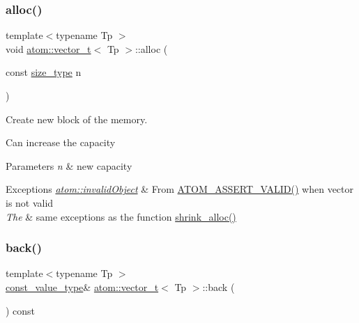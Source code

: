 \subsubsection{\texorpdfstring{alloc()}{alloc()}}
{\footnotesize\ttfamily template$<$typename Tp $>$ \\
void \hyperlink{classatom_1_1vector__t}{atom\+::vector\+\_\+t}$<$ Tp $>$\+::alloc (\begin{DoxyParamCaption}\item[{const \hyperlink{classatom_1_1vector__t_a1790d79321f4fa8d2580474dd0f56033}{size\+\_\+type}}]{n }\end{DoxyParamCaption})\hspace{0.3cm}{\ttfamily [private]}}



Create new block of the memory. 

Can increase the capacity 
\begin{DoxyParams}{Parameters}
{\em n} & new capacity \\
\hline
\end{DoxyParams}

\begin{DoxyExceptions}{Exceptions}
{\em \hyperlink{classatom_1_1invalid_object}{atom\+::invalid\+Object}} & From \hyperlink{debug__tools_8h_a273b49426c51bc6a7eb989ee0acbdc6b}{A\+T\+O\+M\+\_\+\+A\+S\+S\+E\+R\+T\+\_\+\+V\+A\+L\+I\+D()} when vector is not valid \\
\hline
{\em The} & same exceptions as the function \hyperlink{classatom_1_1vector__t_afdf1ffed030302fa380605478984b854}{shrink\+\_\+alloc()} \\
\hline
\end{DoxyExceptions}
\mbox{\label{classatom_1_1vector__t_a081ce30b6b112520ce41879cf383a409}} 
\subsubsection{\texorpdfstring{back()}{back()}}
{\footnotesize\ttfamily template$<$typename Tp $>$ \\
\hyperlink{classatom_1_1vector__t_a14fe7ee127e522f41f345462311c924e}{const\+\_\+value\+\_\+type}\& \hyperlink{classatom_1_1vector__t}{atom\+::vector\+\_\+t}$<$ Tp $>$\+::back (\begin{DoxyParamCaption}{ }\end{DoxyParamCaption}) const\hspace{0.3cm}{\ttfamily [inline]}}



